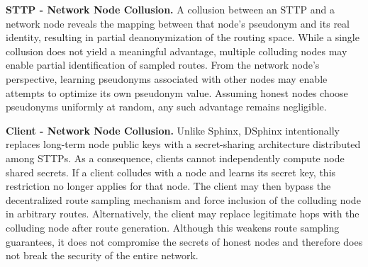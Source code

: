 \smallskip
\noindent\textbf{STTP - Network Node Collusion.}
A collusion between an STTP and a network node reveals the mapping between that node's pseudonym and its real identity, resulting in partial deanonymization of the routing space. 
While a single collusion does not yield a meaningful advantage, multiple colluding nodes may enable partial identification of sampled routes. 
From the network node's perspective, learning pseudonyms associated with other nodes may enable attempts to optimize its own pseudonym value.
Assuming honest nodes choose pseudonyms uniformly at random, any such advantage remains negligible.

\smallskip
\noindent\textbf{Client - Network Node Collusion.}
Unlike Sphinx, DSphinx intentionally replaces long-term node public keys with a secret-sharing architecture distributed among STTPs.
As a consequence, clients cannot independently compute node shared secrets.
If a client colludes with a node and learns its secret key, this restriction no longer applies for that node.
The client may then bypass the decentralized route sampling mechanism and force inclusion of the colluding node in arbitrary routes.
Alternatively, the client may replace legitimate hops with the colluding node after route generation.
Although this weakens route sampling guarantees, it does not compromise the secrets of honest nodes and therefore does not break the security of the entire network.
